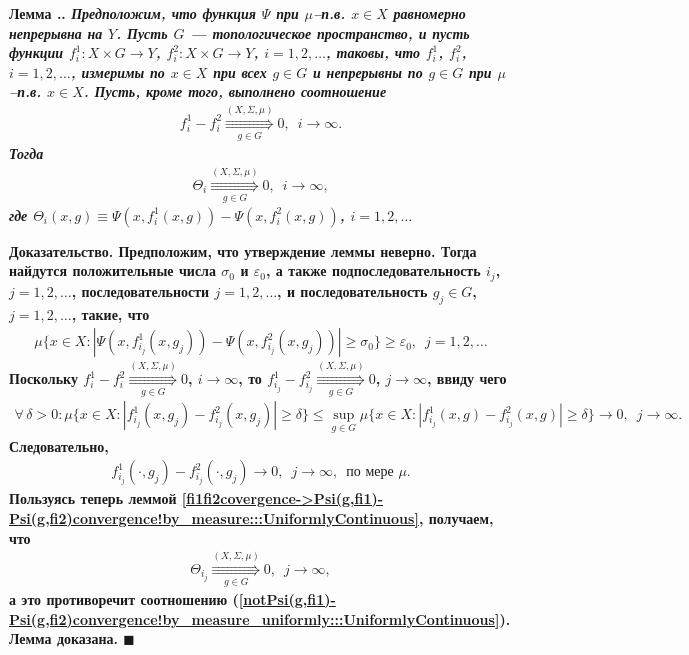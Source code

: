 \documentclass{report}
\newcounter{lem}[section]
\renewcommand{\thelem}{\thesection.\arabic{lem}}
\newenvironment{Lemma}{\par\refstepcounter{lem}\bf Лемма \thelem. \it}{\rm\par}
\newenvironment{Proof}{\par\noindent\bf Доказательство.\rm}{ $\blacksquare$\par}
\newcommand{\ByMeasureUniformly}{\mathop{\Rrightarrow}}
\begin{document}
\begin{Lemma}\label{fi1fi2covergence->Psi(g,fi1)-Psi(g,fi2)convergence!by_measure_uniformly:::UniformlyContinuous}
Предположим, что функция $\Psi$ при $\mu$--п.в. $x\in X$ равномерно непрерывна на $Y$. Пусть $G$ --- топологическое пространство, и пусть функции $f_i^1\colon X\times G\to Y$,
$f_i^2\colon X\times G\to Y$, $i=1,2,\dots$, таковы, что $f_i^1$, $f_i^2$, $i=1,2,\dots$, измеримы по $x\in X$ при всех $g\in G$ и непрерывны по $g\in G$ при $\mu$--п.в. $x\in X$. Пусть,
кроме того, выполнено соотношение
\begin{gather}\label{fi1-fi2:uniform_convergence_by_measure:::UniformlyContinuous}
f_i^1-f_i^2\ByMeasureUniformly\limits_{g\in G}^{(X,\Sigma,\mu)}0,\,\,\,i\to\infty.
\end{gather}
Тогда
\begin{gather*}
\Theta_i\ByMeasureUniformly\limits_{g\in G}^{(X,\Sigma,\mu)}0,\,\,\,i\to\infty,
\end{gather*}
где $\Theta_i(x,g)\equiv\Psi(x,f_i^1(x,g))-\Psi(x,f_i^2(x,g))$, $i=1,2,\dots$
\end{Lemma}
\begin{Proof}
Предположим, что утверждение леммы неверно. Тогда найдутся положительные числа $\sigma_0$ и $\varepsilon_0$, а также подпоследовательность $i_j$, $j=1,2,\dots$, последовательности
$j=1,2,\dots$, и последовательность $g_j\in G$, $j=1,2,\dots$, такие, что
\begin{gather}\label{notPsi(g,fi1)-Psi(g,fi2)convergence!by_measure_uniformly:::UniformlyContinuous}
\mu\{x\in X:|\Psi(x,f_{i_j}^1(x,g_j))-\Psi(x,f_{i_j}^2(x,g_j))|\geqslant\sigma_0\}\geqslant\varepsilon_0,\,\,\,j=1,2,\dots
\end{gather}
Поскольку $f_i^1-f_i^2\ByMeasureUniformly\limits_{g\in G}^{(X,\Sigma,\mu)}0$, $i\to\infty$, то $f_{i_j}^1-f_{i_j}^2\ByMeasureUniformly\limits_{g\in G}^{(X,\Sigma,\mu)}0$, $j\to\infty$,
ввиду чего
\begin{gather*}
\forall\,\delta>0:\mu\{x\in X:|f_{i_j}^1(x,g_j)-f_{i_j}^2(x,g_j)|\geqslant\delta\}\leqslant\sup\limits_{g\in G}\mu\{x\in X:|f_{i_j}^1(x,g)-f_{i_j}^2(x,g)|\geqslant\delta\}\to0,\,\,\,
j\to\infty.
\end{gather*}
Следовательно,
\begin{gather*}
f_{i_j}^1(\cdot,g_j)-f_{i_j}^2(\cdot,g_j)\to0,\,\,\,j\to\infty,\,\,\,\text{по мере $\mu$}.
\end{gather*}
Пользуясь теперь леммой \ref{fi1fi2covergence->Psi(g,fi1)-Psi(g,fi2)convergence!by_measure:::UniformlyContinuous}, получаем, что
\begin{gather*}
\Theta_{i_j}\ByMeasureUniformly\limits_{g\in G}^{(X,\Sigma,\mu)}0,\,\,\,j\to\infty,
\end{gather*}
а это противоречит соотношению (\ref{notPsi(g,fi1)-Psi(g,fi2)convergence!by_measure_uniformly:::UniformlyContinuous}). Лемма доказана.
\end{Proof}
\end{document}
